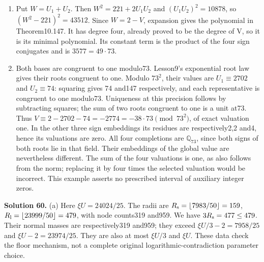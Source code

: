\documentclass[
  11pt,
  a4paper,
]{article}
\begin{document}
\begin{enumerate}
\def\labelenumi{(\alph{enumi})}
\setcounter{enumi}{1}
\item
  Put \(W=U_1+U_2\). Then \(W^2=221+2U_1U_2\) and \((U_1U_2)^2=10878\),
  so \((W^2-221)^2=43512\). Since \(W=2-V\), expansion gives the
  polynomial in Theorem10.147. It has degree four, already proved to be
  the degree of V, so it is its minimal polynomial. Its constant term is
  the product of the four sign conjugates and is \(3577=49\cdot73\).
\item
  Both bases are congruent to one modulo73. Lesson9's exponential root
  law gives their roots congruent to one. Modulo \(73^2\), their values
  are \(U_1\equiv2702\) and \(U_2\equiv74\): squaring gives 74 and147
  respectively, and each representative is congruent to one modulo73.
  Uniqueness at this precision follows by subtracting squares; the sum
  of two roots congruent to one is a unit at73. Thus
  \(V\equiv2-2702-74=-2774=-38\cdot73\pmod{73^2}\), of exact valuation
  one. In the other three sign embeddings its residues are
  respectively2,2 and4, hence its valuations are zero. All four
  completions are \(\mathbb Q_{73}\), since both signs of both roots lie
  in that field. Their embeddings of the global value are nevertheless
  different. The sum of the four valuations is one, as also follows from
  the norm; replacing it by four times the selected valuation would be
  incorrect. This example asserts no prescribed interval of auxiliary
  integer zeros.
\end{enumerate}

\textbf{Solution 60.} (a) Here \(\xi U=24024/25\). The radii are
\(R_{\rm s}=\lfloor7983/50\rfloor=159\),
\(R_{\rm l}=\lfloor23999/50\rfloor=479\), with node counts319 and959. We
have \(3R_{\rm s}=477\le479\). Their normal masses are respectively319
and959; they exceed \(\xi U/3-2=7958/25\) and \(\xi U-2=23974/25\). They
are also at most \(\xi U/3\) and \(\xi U\). These data check the floor
mechanism, not a complete original logarithmic-contradiction parameter
choice.
\end{document}
